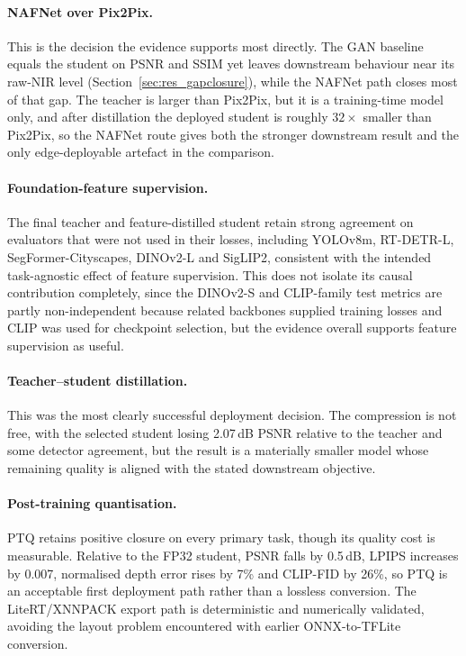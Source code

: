 \paragraph{NAFNet over Pix2Pix.}
This is the decision the evidence supports most directly. The GAN baseline equals the student on PSNR and SSIM yet leaves downstream behaviour near its raw-NIR level (Section~\ref{sec:res_gapclosure}), while the NAFNet path closes most of that gap. The teacher is larger than Pix2Pix, but it is a training-time model only, and after distillation the deployed student is roughly $32\times$ smaller than Pix2Pix, so the NAFNet route gives both the stronger downstream result and the only edge-deployable artefact in the comparison.

\paragraph{Foundation-feature supervision.}
The final teacher and feature-distilled student retain strong agreement on evaluators that were not used in their losses, including YOLOv8m, RT-DETR-L, SegFormer-Cityscapes, DINOv2-L and SigLIP2, consistent with the intended task-agnostic effect of feature supervision. This does not isolate its causal contribution completely, since the DINOv2-S and CLIP-family test metrics are partly non-independent because related backbones supplied training losses and CLIP was used for checkpoint selection, but the evidence overall supports feature supervision as useful.

\paragraph{Teacher--student distillation.}
This was the most clearly successful deployment decision. The compression is not free, with the selected student losing 2.07\,dB PSNR relative to the teacher and some detector agreement, but the result is a materially smaller model whose remaining quality is aligned with the stated downstream objective.

\paragraph{Post-training quantisation.}
PTQ retains positive closure on every primary task, though its quality cost is measurable. Relative to the FP32 student, PSNR falls by 0.5\,dB, LPIPS increases by 0.007, normalised depth error rises by 7\% and CLIP-FID by 26\%, so PTQ is an acceptable first deployment path rather than a lossless conversion. The LiteRT/XNNPACK export path is deterministic and numerically validated, avoiding the layout problem encountered with earlier ONNX-to-TFLite conversion.

